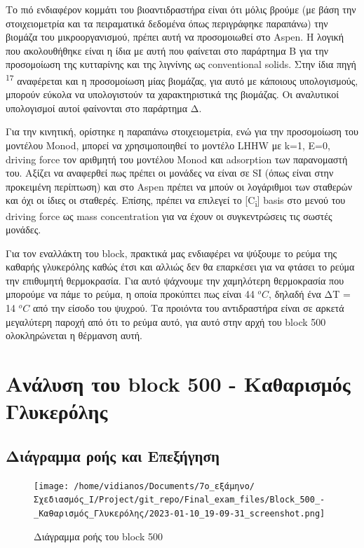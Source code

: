 \documentclass[11pt]{article}
\makeatletter
\newcommand{\citeprocitem}[2]{\hyper@linkstart{cite}{citeproc_bib_item_#1}#2\hyper@linkend}
\makeatother
\begin{document}
Το πιό ενδιαφέρον κομμάτι του βιοαντιδραστήρα είναι ότι μόλις βρούμε (με βάση την στοιχειομετρία και τα πειραματικά δεδομένα όπως περιγράφηκε παραπάνω) την βιομάζα του μικροοργανισμού, πρέπει αυτή να προσομοιωθεί στο Aspen. Η λογική που ακολουθήθηκε είναι η ίδια με αυτή που φαίνεται στο παράρτημα Β για την προσομοίωση της κυτταρίνης και της λιγνίνης ως conventional solids. Στην ίδια πηγή \textsuperscript{\citeprocitem{17}{17}} αναφέρεται και η προσομοίωση μίας βιομάζας, για αυτό με κάποιους υπολογισμούς, μπορούν εύκολα να υπολογιστούν τα χαρακτηριστικά της βιομάζας. Οι αναλυτικοί υπολογισμοί αυτοί φαίνονται στο παράρτημα Δ.

Για την κινητική, ορίστηκε η παραπάνω στοιχειομετρία, ενώ για την προσομοίωση του μοντέλου Monod, μπορεί να χρησιμοποιηθεί το μοντέλο LHHW με k=1, E=0, driving force τον αριθμητή του μοντέλου Monod και adsorption των παρανομαστή του. Αξίζει να αναφερθεί πως πρέπει οι μονάδες να είναι σε SI (όπως είναι στην προκειμένη περίπτωση) και στο Aspen πρέπει να μπούν οι λογάριθμοι των σταθερών και όχι οι ίδιες οι σταθερές. Επίσης, πρέπει να επιλεγεί το [C\textsubscript{i}] basis στο μενού του driving force ως mass concentration για να έχουν οι συγκεντρώσεις τις σωστές μονάδες.

Για τον εναλλάκτη του block, πρακτικά μας ενδιαφέρει να ψύξουμε το ρεύμα της καθαρής γλυκερόλης καθώς έτσι και αλλιώς δεν θα επαρκέσει για να φτάσει το ρεύμα την επιθυμητή θερμοκρασία. Για αυτό ψάχνουμε την χαμηλότερη θερμοκρασία που μπορούμε να πάμε το ρεύμα, η οποία προκύπτει πως είναι 44 \(^oC\), δηλαδή ένα ΔΤ = 14 \(^oC\) από την είσοδο του ψυχρού. Τα προιόντα του αντιδραστήρα είναι σε αρκετά μεγαλύτερη παροχή από ότι το ρεύμα αυτό, για αυτό στην αρχή του block 500 ολοκληρώνεται η θέρμανση αυτή.

\section{Ανάλυση του block 500 - Καθαρισμός Γλυκερόλης}
\label{sec:orgd80c6c3}

\subsection{Διάγραμμα ροής και Επεξήγηση}
\label{sec:org07e9853}
\begin{figure}[htbp]
\centering
\texttt{[image: /home/vidianos/Documents/7o\_εξάμηνο/Σχεδιασμός\_Ι/Project/git\_repo/Final\_exam\_files/Block\_500\_-\_Καθαρισμός\_Γλυκερόλης/2023-01-10\_19-09-31\_screenshot.png]}
\caption{Διάγραμμα ροής του block 500}
\end{figure}
\end{document}

